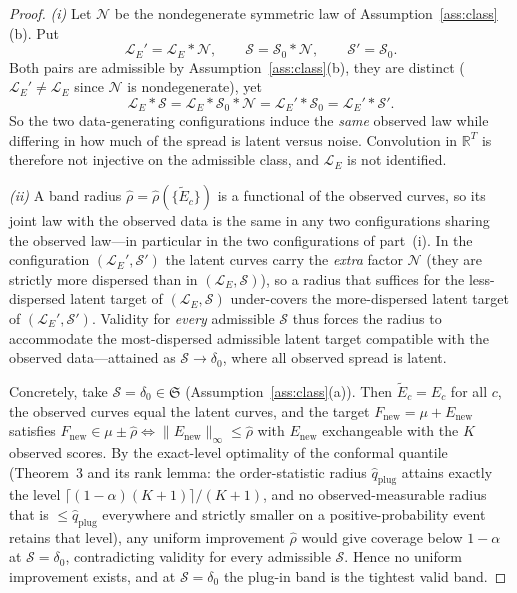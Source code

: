 \documentclass[12pt]{article}
\theoremstyle{definition}
\theoremstyle{remark}
\newcommand{\Fnew}{F_{\mathrm{new}}}
\newcommand{\Enew}{E_{\mathrm{new}}}
\newcommand{\law}{\mathcal L}
\newcommand{\normi}[1]{\lVert #1\rVert_\infty}
\begin{document}
\begin{proof}
\emph{(i)} Let $\mathcal N$ be the nondegenerate symmetric law of
Assumption~\ref{ass:class}(b). Put
\[
  \law_E'=\law_E*\mathcal N,\qquad \mathcal S=\mathcal S_0*\mathcal N,\qquad
  \mathcal S'=\mathcal S_0 .
\]
Both pairs are admissible by Assumption~\ref{ass:class}(b), they are distinct
($\law_E'\ne\law_E$ since $\mathcal N$ is nondegenerate), yet
\[
  \law_E*\mathcal S=\law_E*\mathcal S_0*\mathcal N
  =\law_E'*\mathcal S_0=\law_E'*\mathcal S' .
\]
So the two data-generating configurations induce the \emph{same} observed law while differing
in how much of the spread is latent versus noise. Convolution in $\mathbb R^{T}$ is therefore
not injective on the admissible class, and $\law_E$ is not identified.

\emph{(ii)} A band radius $\widehat\rho=\widehat\rho(\{\widetilde E_c\})$ is a functional of the
observed curves, so its joint law with the observed data is the same in any two configurations
sharing the observed law---in particular in the two configurations of part~(i). In the
configuration $(\law_E',\mathcal S')$ the latent curves carry the \emph{extra} factor
$\mathcal N$ (they are strictly more dispersed than in $(\law_E,\mathcal S)$), so a radius that
suffices for the less-dispersed latent target of $(\law_E,\mathcal S)$ under-covers the
more-dispersed latent target of $(\law_E',\mathcal S')$. Validity for \emph{every} admissible
$\mathcal S$ thus forces the radius to accommodate the most-dispersed admissible latent target
compatible with the observed data---attained as $\mathcal S\to\delta_0$, where all observed
spread is latent.

Concretely, take $\mathcal S=\delta_0\in\mathfrak S$ (Assumption~\ref{ass:class}(a)). Then
$\widetilde E_c=E_c$ for all $c$, the observed curves equal the latent curves, and the target
$\Fnew=\mu+\Enew$ satisfies $\Fnew\in\mu\pm\widehat\rho\iff\normi{\Enew}\le\widehat\rho$ with
$\Enew$ exchangeable with the $K$ observed scores. By the exact-level optimality of the
conformal quantile (Theorem~3 and its rank lemma: the order-statistic radius
$\widehat q_{\mathrm{plug}}$ attains exactly the level $\lceil(1-\alpha)(K+1)\rceil/(K+1)$, and
no observed-measurable radius that is $\le\widehat q_{\mathrm{plug}}$ everywhere and strictly
smaller on a positive-probability event retains that level), any uniform improvement
$\widehat\rho$ would give coverage below $1-\alpha$ at $\mathcal S=\delta_0$, contradicting
validity for every admissible $\mathcal S$. Hence no uniform improvement exists, and at
$\mathcal S=\delta_0$ the plug-in band is the tightest valid band.
\end{proof}
\end{document}
